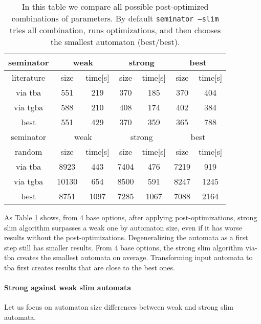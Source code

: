 \documentclass[
	digital,
nolof, nolot
]{fithesis3}
\begin{document}
	\begin{table}[ht]
		
		\centering
		\caption{In this table we compare all possible post-optimized combinations of parameters. By default \texttt{seminator --slim} tries all combination, runs optimizations, and then chooses the smallest automaton (best/best). }
		\label{table:seminator:optimized}
		\begin{tabular}{ |c||c|c|c|c|c|c| } 
			\hline
			seminator&\multicolumn{2}{c|}{weak}&\multicolumn{2}{c|}{strong}&\multicolumn{2}{c|}{best} \\
			\hline
			literature&size&time[s]&size&time[s]&size&time[s]\\
			\hhline{|=======|}
			
			via tba&551&219& 370 &185& 370&404\\
			\hline
			via tgba&588&210& 408&174& 402&384\\ 
			\hline
			best&551&429& 370&359& 365&788 \\ 
			\hline
			
			
			\hline
			seminator&\multicolumn{2}{c|}{weak}&\multicolumn{2}{c|}{strong}&\multicolumn{2}{c|}{best} \\
			\hline
			random&size&time[s]&size&time[s]&size&time[s]\\
			\hhline{|=======|}
			via tba&8923&443& 7404 &476& 7219&919\\
			\hline
			via tgba&10130&654& 8500&591& 8247&1245\\ 
			\hline
			best&8751&1097& 7285&1067& 7088&2164 \\ 
			\hline
		\end{tabular}
	\end{table}

	
	As Table \ref{table:seminator:optimized} shows, from 4 base options, after applying post-optimizations, strong slim algorithm surpasses a weak one by automaton size, even if it has worse results without the post-optimizations.
	Degeneralizing the automata as a first step still has smaller results.
	From 4 base options, the strong slim algorithm via-tba creates the smallest automata on average.
	Transforming input automata to tba first creates results that are close to the best ones. 
	
	
	\paragraph{Strong against weak slim automata}
	Let us focus on automaton size differences between weak and strong slim automata.
	
\end{document}
